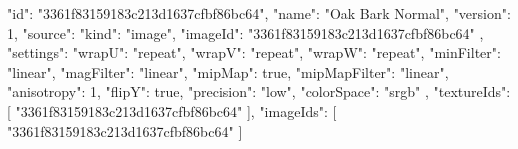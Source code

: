 {
  "id": "3361f83159183c213d1637cfbf86bc64",
  "name": "Oak Bark Normal",
  "version": 1,
  "source": {
    "kind": "image",
    "imageId": "3361f83159183c213d1637cfbf86bc64"
  },
  "settings": {
    "wrapU": "repeat",
    "wrapV": "repeat",
    "wrapW": "repeat",
    "minFilter": "linear",
    "magFilter": "linear",
    "mipMap": true,
    "mipMapFilter": "linear",
    "anisotropy": 1,
    "flipY": true,
    "precision": "low",
    "colorSpace": "srgb"
  },
  "textureIds": [
    "3361f83159183c213d1637cfbf86bc64"
  ],
  "imageIds": [
    "3361f83159183c213d1637cfbf86bc64"
  ]
}
